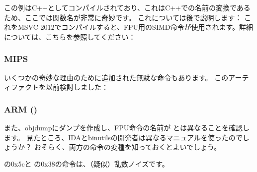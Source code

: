 

この例はC++としてコンパイルされており、これはC++での名前の変換であるため、ここでは関数名が非常に奇妙です。
これについては後で説明します：
これをMSVC 2012でコンパイルすると、FPU用のSIMD命令が使用されます。詳細については、こちらを参照してください：

\subsubsection{MIPS}



いくつかの奇妙な理由のために追加された無駄な命令もあります。 
このアーティファクトを以前検討しました：

\subsubsection{ARM (\ARMMode)}




また、objdumpにダンプを作成し、FPU命令の名前が \IDA とは異なることを確認します。 
見たところ、IDAとbinutilsの開発者は異なるマニュアルを使ったのでしょうか？ 
おそらく、両方の命令の変種を知っておくとよいでしょう。



の0x5cと \main の0x38の命令は、（疑似）乱数ノイズです。
